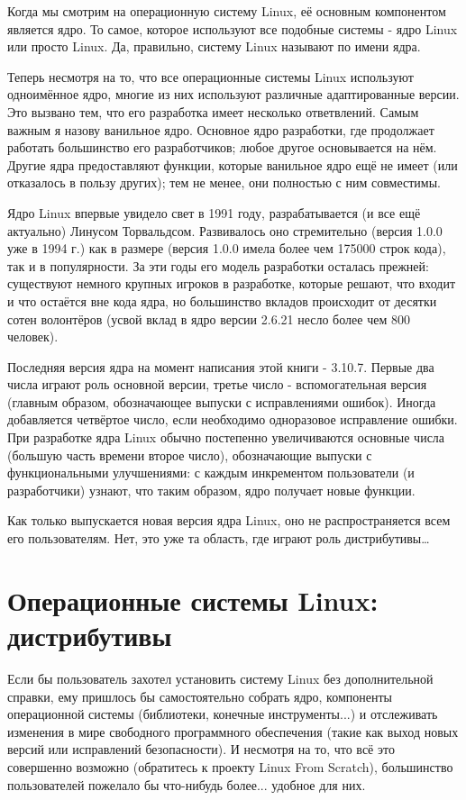 \documentclass[10pt]{book}
\begin{document}
Когда мы смотрим на операционную систему Linux, её основным компонентом является ядро. То самое, которое используют все подобные системы - ядро Linux или просто Linux. Да, правильно, систему Linux называют по имени ядра.

Теперь несмотря на то, что все операционные системы Linux используют одноимённое ядро, многие из них используют различные адаптированные версии. Это вызвано тем, что  его разработка имеет несколько ответвлений. Самым важным я назову ванильное ядро. Основное ядро разработки, где  продолжает работать большинство его разработчиков; любое другое основывается на нём. Другие ядра предоставляют функции, которые ванильное ядро  ещё не имеет (или отказалось в пользу других); тем не менее, они полностью с ним совместимы.

Ядро Linux впервые увидело  свет в 1991 году, разрабатывается (и все ещё актуально) Линусом Торвальдсом. Развивалось оно стремительно (версия 1.0.0 уже в 1994 г.) как в размере (версия 1.0.0 имела более чем 175000 строк кода), так и в популярности. За эти годы его модель разработки осталась прежней: существуют немного крупных игроков в разработке, которые решают, что входит и что остаётся вне кода ядра, но большинство вкладов происходит от десятки сотен волонтёров (усвой вклад в ядро версии 2.6.21 несло более чем  800 человек).

Последняя версия ядра на момент написания этой книги - 3.10.7. Первые два числа играют роль основной версии, третье число - вспомогательная версия (главным образом, обозначающее выпуски с исправлениями ошибок). Иногда добавляется четвёртое число, если необходимо одноразовое исправление ошибки. При разработке ядра Linux обычно постепенно увеличиваются основные числа (большую часть времени второе число), обозначающие выпуски с функциональными улучшениями: с каждым инкрементом пользователи (и разработчики) узнают, что таким образом, ядро получает новые функции.

Как только выпускается новая версия ядра Linux, оно не распространяется всем его пользователям. Нет, это уже та область, где играют роль дистрибутивы\ldots

\section{Операционные системы Linux: дистрибутивы}

Если бы пользователь захотел установить систему Linux без дополнительной справки, ему пришлось бы самостоятельно собрать ядро, компоненты операционной системы (библиотеки, конечные инструменты...) и отслеживать изменения в мире свободного программного обеспечения (такие как выход новых версий или исправлений безопасности). И несмотря на то, что всё это совершенно возможно (обратитесь к проекту Linux From Scratch), большинство пользователей пожелало бы что-нибудь более... удобное для них.
\end{document}
